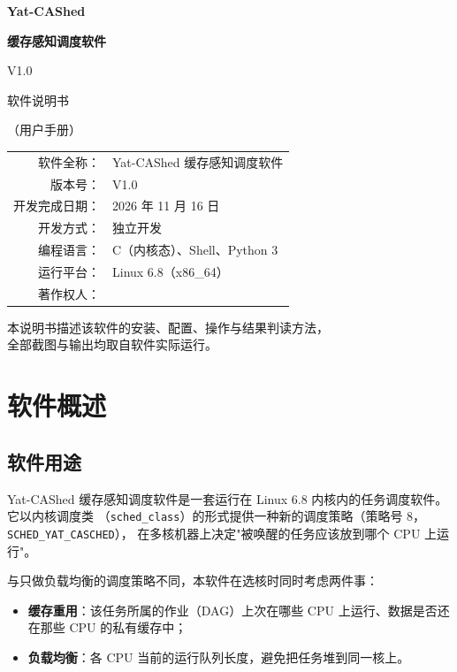 \documentclass[11pt,a4paper]{article}
\newcommand{\code}[1]{\texttt{#1}}
\begin{document}
\begin{titlepage}
\centering
\vspace*{2.2cm}
{\LARGE\bfseries Yat-CAShed\par}
\vspace{0.6cm}
{\Huge\bfseries 缓存感知调度软件\par}
\vspace{0.6cm}
{\LARGE V1.0\par}
\vspace{1.6cm}
{\Large 软件说明书\par}
\vspace{0.4cm}
{\large （用户手册）\par}
\vspace{3.2cm}
\begin{tabular}{rl}
软件全称： & Yat-CAShed 缓存感知调度软件 \\
版本号： & V1.0 \\
开发完成日期： & 2026 年 11 月 16 日 \\
开发方式： & 独立开发 \\
编程语言： & C（内核态）、Shell、Python 3 \\
运行平台： & Linux 6.8（x86\_64） \\
著作权人： & \underline{\hspace{7cm}} \\
\end{tabular}
\vfill
{\small 本说明书描述该软件的安装、配置、操作与结果判读方法，\\
全部截图与输出均取自软件实际运行。\par}
\end{titlepage}

\tableofcontents
\newpage

\section{软件概述}

\subsection{软件用途}

Yat-CAShed 缓存感知调度软件是一套运行在 Linux 6.8 内核内的任务调度软件。它以内核调度类
（\code{sched\_class}）的形式提供一种新的调度策略（策略号 8，\code{SCHED\_YAT\_CASCHED}），
在多核机器上决定"被唤醒的任务应该放到哪个 CPU 上运行"。

与只做负载均衡的调度策略不同，本软件在选核时同时考虑两件事：

\begin{itemize}
  \item \textbf{缓存重用}：该任务所属的作业（DAG）上次在哪些 CPU 上运行、数据是否还在那些
        CPU 的私有缓存中；
  \item \textbf{负载均衡}：各 CPU 当前的运行队列长度，避免把任务堆到同一核上。
\end{itemize}
\end{document}
